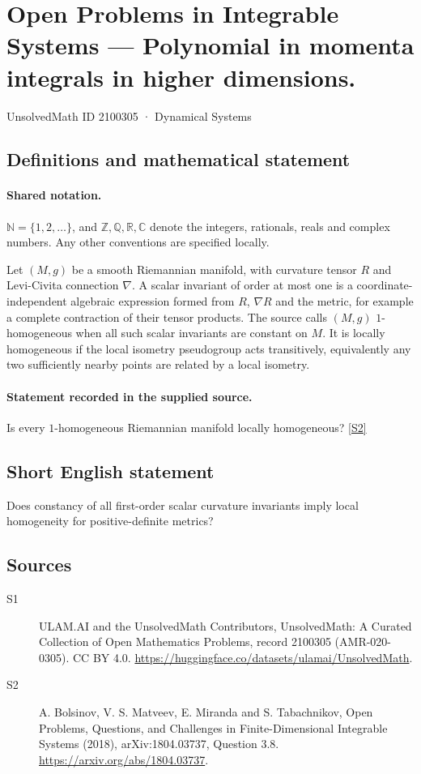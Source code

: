 \documentclass[11pt]{article}
\newcommand{\sref}[2]{\hyperlink{source:#1:#2}{[S#2]}}
\begin{document}
\setcounter{section}{2100304}
\section{Open Problems in Integrable Systems — Polynomial in momenta integrals in higher dimensions.}\label{2100305}
{\small\sffamily UnsolvedMath ID 2100305 · Dynamical Systems}
\subsection{Definitions and mathematical statement}

\paragraph{Shared notation.}$\mathbb N=\{1,2,\ldots\}$, and $\mathbb Z,\mathbb Q,\mathbb R,\mathbb C$ denote the integers, rationals, reals and complex numbers. Any other conventions are specified locally.


Let $(M,g)$ be a smooth Riemannian manifold, with curvature tensor $R$ and Levi-Civita connection $\nabla$. A scalar invariant of order at most one is a coordinate-independent algebraic expression formed from $R$, $\nabla R$ and the metric, for example a complete contraction of their tensor products. The source calls $(M,g)$ $1$-homogeneous when all such scalar invariants are constant on $M$. It is locally homogeneous if the local isometry pseudogroup acts transitively, equivalently any two sufficiently nearby points are related by a local isometry.
\paragraph{Statement recorded in the supplied source.}
Is every $1$-homogeneous Riemannian manifold locally homogeneous? \sref{2100305}{2}
\subsection{Short English statement}
Does constancy of all first-order scalar curvature invariants imply local homogeneity for positive-definite metrics?
\subsection{Sources}
\begin{description}
\item[\hypertarget{source:2100305:1}{S1}] ULAM.AI and the UnsolvedMath Contributors, UnsolvedMath: A Curated Collection of Open Mathematics Problems, record 2100305 (AMR-020-0305). CC BY 4.0. \url{https://huggingface.co/datasets/ulamai/UnsolvedMath}.
\item[\hypertarget{source:2100305:2}{S2}] A. Bolsinov, V. S. Matveev, E. Miranda and S. Tabachnikov, Open Problems, Questions, and Challenges in Finite-Dimensional Integrable Systems (2018), arXiv:1804.03737, Question 3.8. \url{https://arxiv.org/abs/1804.03737}.
\end{description}
\label{end:2100305}
\end{document}
